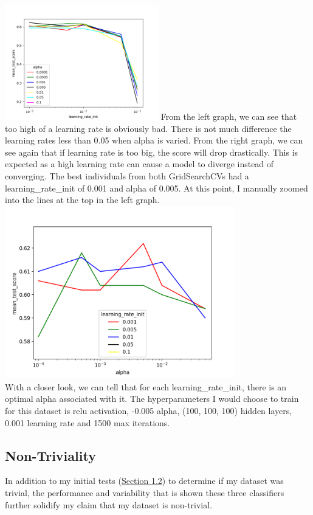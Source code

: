\documentclass[12pt]{article}
\begin{document}
\includegraphics[width=0.5\textwidth]{MLP_fin_learning_rate_init_line.png}
From the left graph, we can see that too high of a learning rate is obviously bad. There is not much difference the learning rates less than 0.05 when alpha is varied. From the right graph, we can see again that if learning rate is too big, the score will drop drastically. This is expected as a high learning rate can cause a model to diverge instead of converging. The best individuals from both GridSearchCVs had a learning\_rate\_init of 0.001 and alpha of 0.005. At this point, I manually zoomed into the lines at the top in the left graph. \\ 
\includegraphics[width=0.75\textwidth]{MLP_fin_alpha_line_zoom.png} \\
With a closer look, we can tell that for each learning\_rate\_init, there is an optimal alpha associated with it. The hyperparameters I would choose to train for this dataset is relu activation, -0.005 alpha, (100, 100, 100) hidden layers, 0.001 learning rate and 1500 max iterations.
\subsection{Non-Triviality}
\label{notrivial}
In addition to my initial tests (\hyperref[trivial]{Section 1.2}) to determine if my dataset was trivial, the performance and variability that is shown these three classifiers further solidify my claim that my dataset is non-trivial.
\end{document}
